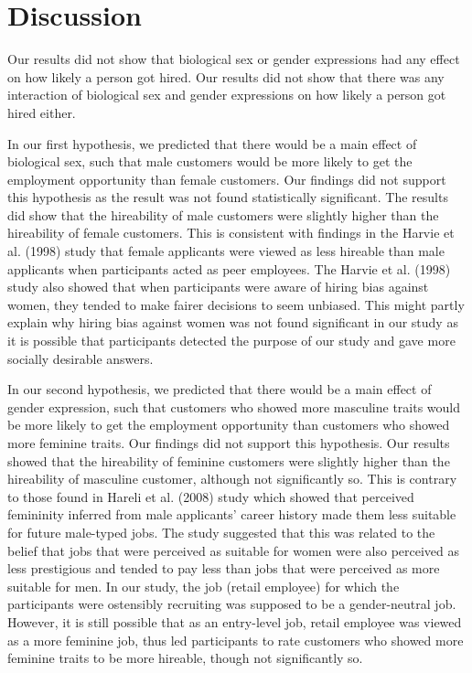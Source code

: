 \documentclass[english,man]{apa6}
\theoremstyle{definition}
\theoremstyle{definition}
\theoremstyle{remark}
\begin{document}
\section{Discussion}\label{discussion}

Our results did not show that biological sex or gender expressions had
any effect on how likely a person got hired. Our results did not show
that there was any interaction of biological sex and gender expressions
on how likely a person got hired either.

In our first hypothesis, we predicted that there would be a main effect
of biological sex, such that male customers would be more likely to get
the employment opportunity than female customers. Our findings did not
support this hypothesis as the result was not found statistically
significant. The results did show that the hireability of male customers
were slightly higher than the hireability of female customers. This is
consistent with findings in the Harvie et al. (1998) study that female
applicants were viewed as less hireable than male applicants when
participants acted as peer employees. The Harvie et al. (1998) study
also showed that when participants were aware of hiring bias against
women, they tended to make fairer decisions to seem unbiased. This might
partly explain why hiring bias against women was not found significant
in our study as it is possible that participants detected the purpose of
our study and gave more socially desirable answers.

In our second hypothesis, we predicted that there would be a main effect
of gender expression, such that customers who showed more masculine
traits would be more likely to get the employment opportunity than
customers who showed more feminine traits. Our findings did not support
this hypothesis. Our results showed that the hireability of feminine
customers were slightly higher than the hireability of masculine
customer, although not significantly so. This is contrary to those found
in Hareli et al. (2008) study which showed that perceived femininity
inferred from male applicants' career history made them less suitable
for future male-typed jobs. The study suggested that this was related to
the belief that jobs that were perceived as suitable for women were also
perceived as less prestigious and tended to pay less than jobs that were
perceived as more suitable for men. In our study, the job (retail
employee) for which the participants were ostensibly recruiting was
supposed to be a gender-neutral job. However, it is still possible that
as an entry-level job, retail employee was viewed as a more feminine
job, thus led participants to rate customers who showed more feminine
traits to be more hireable, though not significantly so.
\end{document}
